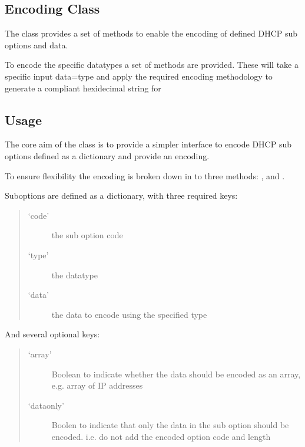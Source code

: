\documentclass[letterpaper,10pt,english]{sphinxmanual}
\begin{document}
\subsection{Encoding Class}
\label{\detokenize{dhcp_encode-usage:encoding-class}}
\sphinxAtStartPar
The {\hyperref[\detokenize{dhcp_encode-class:bloxone.dhcp_encode}]{}} class provides a set of  methods
to enable the encoding of defined DHCP sub options and data.

\sphinxAtStartPar
To encode the specific data\sphinxhyphen{}types a set of  methods are provided.
These will take a specific input data=type and apply the required encoding
methodology to generate a compliant hexidecimal string for


\subsection{Usage}
\label{\detokenize{dhcp_encode-usage:usage}}
\sphinxAtStartPar
The core aim of the class is to provide a simpler interface to encode DHCP sub
options defined as a dictionary and provide an encoding.

\sphinxAtStartPar
To ensure flexibility the encoding is broken down in to three methods:
,  and
.

\sphinxAtStartPar
Sub\sphinxhyphen{}options are defined as a dictionary, with three required keys:
\begin{quote}
\begin{description}
\item[{‘code’}] \leavevmode
\sphinxAtStartPar
the sub option code

\item[{‘type’}] \leavevmode
\sphinxAtStartPar
the data\sphinxhyphen{}type

\item[{‘data’}] \leavevmode
\sphinxAtStartPar
the data to encode using the specified type

\end{description}
\end{quote}

\sphinxAtStartPar
And several optional keys:
\begin{quote}
\begin{description}
\item[{‘array’}] \leavevmode
\sphinxAtStartPar
Boolean to indicate whether the data should be encoded as
an array, e.g. array of IP addresses

\item[{‘data\sphinxhyphen{}only’}] \leavevmode
\sphinxAtStartPar
Boolen to indicate that only the data in the sub option should
be encoded. i.e. do not add the encoded option code and length

\end{description}
\end{quote}
\end{document}
